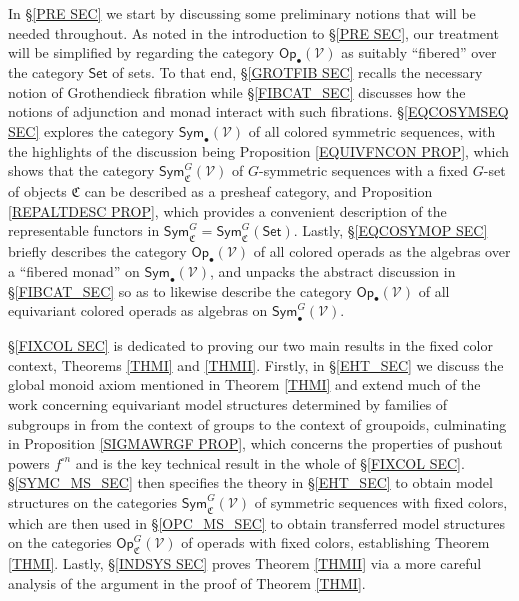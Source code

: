 \documentclass[a4paper,10pt
,draft
]{article}%
\numberwithin{equation}{section}
\numberwithin{figure}{section}
\theoremstyle{definition} %
\newcommand{\V}{\ensuremath{\mathcal V}}
\newcommand{\1}{\ensuremath{\mathbbm 1}}%
\begin{document}
In \S \ref{PRE SEC} we start by discussing some preliminary notions that will be needed throughout.
As noted in the introduction to 
\S \ref{PRE SEC}, our treatment will be simplified by regarding the category
$\mathsf{Op}_{\bullet}(\V)$
as suitably ``fibered'' over the category $\mathsf{Set}$
of sets.
To that end, 
\S \ref{GROTFIB SEC}
recalls the necessary notion of Grothendieck fibration 
while \S \ref{FIBCAT_SEC}
discusses how the notions of adjunction and monad %
interact with such fibrations.
%
\S \ref{EQCOSYMSEQ SEC}
explores the category
$\mathsf{Sym}_{\bullet}(\V)$
of all colored symmetric sequences,
with the highlights of the discussion being 
Proposition \ref{EQUIVFNCON PROP},
which shows that the category
$\mathsf{Sym}^G_{\mathfrak{C}}(\V)$
of $G$-symmetric sequences with a fixed $G$-set of objects
$\mathfrak{C}$ can be described as a presheaf category,
and 
Proposition \ref{REPALTDESC PROP},
which provides a convenient description of the representable functors in 
$\mathsf{Sym}^G_{\mathfrak{C}} = \mathsf{Sym}^G_{\mathfrak{C}}(\mathsf{Set})$.
%
Lastly, \S \ref{EQCOSYMOP SEC}
briefly describes the category 
$\mathsf{Op}_{\bullet}(\V)$ 
of all colored operads as the algebras over a ``fibered monad''
on  
$\mathsf{Sym}_{\bullet}(\V)$,
and unpacks the abstract discussion in \S \ref{FIBCAT_SEC}
so as to likewise describe the category 
$\mathsf{Op}_{\bullet}(\V)$ 
of all equivariant colored operads
as algebras on 
$\mathsf{Sym}^G_{\bullet}(\V)$.


\S \ref{FIXCOL SEC}
is dedicated to proving our two main results in the fixed color context, Theorems \ref{THMI} and \ref{THMII}.
Firstly, in \S \ref{EHT_SEC} we discuss the global monoid axiom mentioned in Theorem \ref{THMI}
and extend much of the work 
concerning equivariant model structures determined by families of subgroups in \cite[\S 6]{BP_geo}
from the context of groups to the context of groupoids,
culminating in 
Proposition \ref{SIGMAWRGF PROP},
which concerns the properties of pushout powers $f^{\square n}$
and is the key technical result in the whole of \S \ref{FIXCOL SEC}.
%
\S \ref{SYMC_MS_SEC} then specifies the theory in
\S \ref{EHT_SEC}
to obtain model structures on the categories
$\mathsf{Sym}^G_{\mathfrak{C}}(\V)$ of symmetric sequences with fixed colors,
which are then used in \S \ref{OPC_MS_SEC}
to obtain transferred model structures on the 
categories
$\mathsf{Op}^G_{\mathfrak{C}}(\V)$
of operads with fixed colors, establishing Theorem \ref{THMI}.
Lastly, \S \ref{INDSYS SEC} proves Theorem \ref{THMII}
via a more careful analysis of the argument in the proof of 
Theorem \ref{THMI}.
\end{document}
